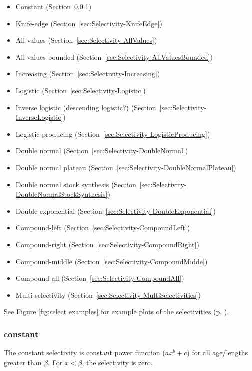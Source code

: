 \begin{itemize}
  \item Constant (Section~\ref{sec:Selectivity-Constant})
  \item Knife-edge (Section~\ref{sec:Selectivity-KnifeEdge})
  \item All values (Section~\ref{sec:Selectivity-AllValues})
  \item All values bounded (Section~\ref{sec:Selectivity-AllValuesBounded})
  \item Increasing (Section~\ref{sec:Selectivity-Increasing})
  \item Logistic (Section~\ref{sec:Selectivity-Logistic})
  \item Inverse logistic (descending logistic?) (Section~\ref{sec:Selectivity-InverseLogistic})
  \item Logistic producing (Section~\ref{sec:Selectivity-LogisticProducing})
  \item Double normal (Section~\ref{sec:Selectivity-DoubleNormal})
  \item Double normal plateau (Section~\ref{sec:Selectivity-DoubleNormalPlateau})
  \item Double normal stock synthesis (Section~\ref{sec:Selectivity-DoubleNormalStockSynthesis})
  \item Double exponential (Section~\ref{sec:Selectivity-DoubleExponential})
  \item Compound-left (Section~\ref{sec:Selectivity-CompoundLeft})
  \item Compound-right (Section~\ref{sec:Selectivity-CompoundRight})
  \item Compound-middle (Section~\ref{sec:Selectivity-CompoundMidde})
  \item Compound-all (Section~\ref{sec:Selectivity-CompoundAll})
  \item Multi-selectivity  (Section~\ref{sec:Selectivity-MultiSelectivities})
\end{itemize}

See Figure \ref{fig:select examples} for example plots of the selectivities (p. \pageref{fig:select examples}).

\subsubsection[Constant]{{constant}}\label{sec:Selectivity-Constant}

The constant selectivity is constant power function ($ax^b+c$) for all age/lengths greater than $\beta$. For $x < \beta$, the selectivity is zero.

